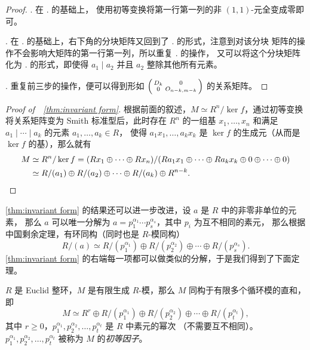 \documentclass[fontset=none,zihao=-4]{Notes}
\begin{document}
\begin{proof}
  \uppercase\expandafter{}.  
  在 \uppercase\expandafter{}. 的基础上，
  使用初等变换将第一行第一列的非 $(1,1)$-元全变成零即可。

  \uppercase\expandafter{}. 
  在 \uppercase\expandafter{}.  的基础上，右下角的分块矩阵又回到了 
  \uppercase\expandafter{}. 的形式，注意到对该分块
  矩阵的操作不会影响大矩阵的第一行第一列，所以重复 \uppercase\expandafter{}. 的操作，
  又可以将这个分块矩阵化为 \uppercase\expandafter{}. 的形式，即使得 $a_1\mid a_2$ 并且 $a_2$ 整除其他所有元素。

  \uppercase\expandafter{}. 重复前三步的操作，便可以得到形如
  $
  \begin{psmallmatrix}
    D_k & 0 \\ 0 & O_{n-k,m-k}
  \end{psmallmatrix}
  $
  的关系矩阵。
\end{proof}

\begin{proof}[Proof of~~\autoref{thm:invariant form}]
  根据前面的叙述，$M\simeq R^n/\ker f$，通过初等变换将关系矩阵变为
  Smith 标准型后，此时存在 $R^n$ 的一组基 $x_1,\dots,x_n$ 
  和满足 $a_1\mid \cdots\mid a_k$ 的元素 $a_1,\dots,a_k\in R$，
  使得 $a_1x_1,\dots,a_kx_k$ 是 $\ker f$ 的生成元（从而是 $\ker f$
  的基），那么就有
  \begin{align*}
    M&\simeq R^n/\ker f
    =(Rx_1\oplus\cdots\oplus Rx_n)/(Ra_1x_1\oplus \cdots\oplus Ra_kx_k\oplus 0\oplus\cdots \oplus0)\\
    &\simeq R/(a_1)\oplus R/(a_2)\oplus\cdots\oplus R/(a_k)\oplus R^{n-k}  .
    \qedhere
  \end{align*}
\end{proof}

\autoref{thm:invariant form} 的结果还可以进一步改进，设 $a$ 是 $R$ 中的非零非单位的元素，
那么 $a$ 可以唯一分解为 $a=p_1^{\alpha_1}\cdots p_s^{\alpha_s}$，其中 $p_i$ 为互不相同的素元，
那么根据中国剩余定理，有环同构（同时也是 $R$-模同构）
\[
  R/(a)\simeq R/(p_1^{\alpha_1})  \oplus R/(p_2^{\alpha_2})\oplus\cdots\oplus R/(p_s^{\alpha_s}).
\]
\autoref{thm:invariant form} 的右端每一项都可以做类似的分解，于是我们得到了下面定理。

\begin{theorem}\label{thm:element form}
  $R$ 是 Euclid 整环，$M$ 是有限生成 $R$-模，那么 $M$ 同构于有限多个循环模的直和，即
  \[
    M\simeq R^r\oplus R/(p_1^{\alpha_1})\oplus R/(p_2^{\alpha_2})\oplus\cdots  \oplus R/(p_t^{\alpha_t}),
  \]
  其中 $r\geq 0$，$p_1^{\alpha_1},p_2^{\alpha_2},\dots,p_t^{\alpha_t}$ 是 $R$ 中素元的幂次
  （不需要互不相同）。 $p_1^{\alpha_1},p_2^{\alpha_2},\dots,p_t^{\alpha_t}$
  被称为 $M$ 的\emph{初等因子}。
\end{theorem}
\end{document}
